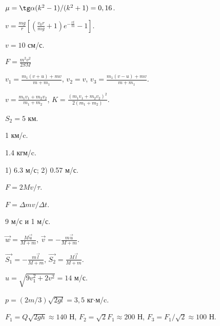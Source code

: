 \begin{Answer}{74}
$\mu = \tg \alpha (k^2-1)/(k^2+1) = 0,16$.
\end{Answer}
\begin{Answer}{75}
$v = \frac{mg}{r}\left[ \left( \frac{v_0r}{mg} +1 \right)e^{-\frac{rt}{m}} - 1 \right]$.
\end{Answer}
\begin{Answer}{76}
$v=10$ см/с.
\end{Answer}
\begin{Answer}{77}
$F = \frac{m^2 v^2}{2SM}$
\end{Answer}
\begin{Answer}{78}
$v_1 = \frac{m_1(v+u)+mv}{m+m_1}$, $v_2 = v$, $v_3 = \frac{m_1(v-u)+mv}{m+m_1}$.
\end{Answer}
\begin{Answer}{79}
$v = \frac{m_1v_1 + m_2v_2}{m_1+m_2}$, $K = \frac{(m_1v_1+m_2v_2)^2}{2(m_1+m_2)}$.
\end{Answer}
\begin{Answer}{80}
$S_2 = 5$ км.
\end{Answer}
\begin{Answer}{85}
1 км/c.
\end{Answer}
\begin{Answer}{86}
1.4 кгм/c.
\end{Answer}
\begin{Answer}{87}
1) 6.3 м/с; 2) 0.57 м/с.
\end{Answer}
\begin{Answer}{88}
$F = 2Mv/\tau$.
\end{Answer}
\begin{Answer}{89}
$F = \Delta m v/ \Delta t$.
\end{Answer}
\begin{Answer}{90}
9 м/с и 1 м/с.
\end{Answer}
\begin{Answer}{91}
$\vec{w} = \frac{M\vec{u}}{M+m}$, $\vec{v} = -\frac{m\vec{u}}{M+m}$.
\end{Answer}
\begin{Answer}{92}
$\vec{S_1} = -\frac{m\vec{l}}{M+m}$, $\vec{S_2} = \frac{M\vec{l}}{M+m}$.
\end{Answer}
\begin{Answer}{93}
$u = \sqrt{9v_{1}^2 + 2v^2} = 14$ м/с.
\end{Answer}
\begin{Answer}{94}
$p = (2m/3)\sqrt{2gl} = 3,5$ кг$\cdot$м/c.
\end{Answer}
\begin{Answer}{95}
$F_1 = Q\sqrt{2gh} \approx 140$ Н, $F_2 = \sqrt{2} F_1 \approx 200$ Н, $F_3 = F_1/\sqrt{2} \approx 100$ Н.
\end{Answer}
